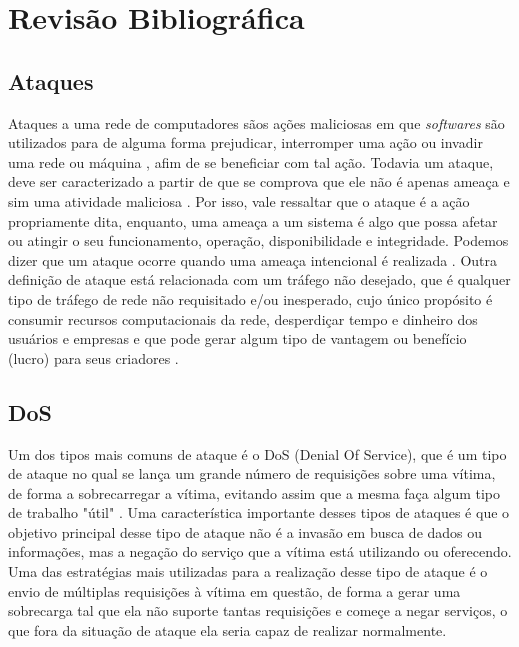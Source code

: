 \chapter[Revisão Bibliográfica]{Revisão Bibliográfica}
\label{fundamentacao}
\section{Ataques}
Ataques a uma rede de computadores sãos ações maliciosas em que \textit{softwares} são utilizados para de alguma forma prejudicar, interromper uma ação ou invadir uma rede ou máquina , afim de se beneficiar com tal ação. Todavia um ataque, deve ser caracterizado a partir de que se comprova que ele não é apenas ameaça e sim uma atividade maliciosa . Por isso, vale ressaltar que o ataque é a ação propriamente dita, enquanto, uma ameaça a um sistema é algo que possa afetar ou atingir o seu funcionamento, operação, disponibilidade e integridade. Podemos dizer que um ataque ocorre quando uma ameaça intencional é realizada \cite{dos2017ameaccas}.  Outra definição de ataque está relacionada com um tráfego não desejado, que é qualquer tipo de tráfego de rede não requisitado e/ou inesperado, cujo único propósito é consumir recursos computacionais da rede, desperdiçar tempo e dinheiro dos usuários e empresas e que pode gerar algum tipo de vantagem ou benefício (lucro) para seus criadores \cite{feitosa2008trafego}. 
\section{DoS}
Um dos tipos mais comuns de ataque é o DoS (Denial Of Service), que  é um tipo de ataque no qual se lança um grande número de requisições sobre uma vítima, de forma a sobrecarregar a vítima, evitando assim que a mesma faça algum tipo de trabalho "útil" \cite{handley2006internet}. Uma característica importante desses tipos de ataques é que o objetivo principal desse tipo de ataque não é a invasão em busca de dados ou informações, mas a negação do serviço que a vítima está utilizando ou oferecendo.  Uma das estratégias mais utilizadas para a realização desse tipo de ataque é o envio de múltiplas requisições à vítima em questão, de forma a gerar uma sobrecarga tal que ela não suporte tantas requisições e começe a negar serviços, o que fora da situação de ataque ela seria capaz de realizar normalmente\cite{mandia2001hackers}.

